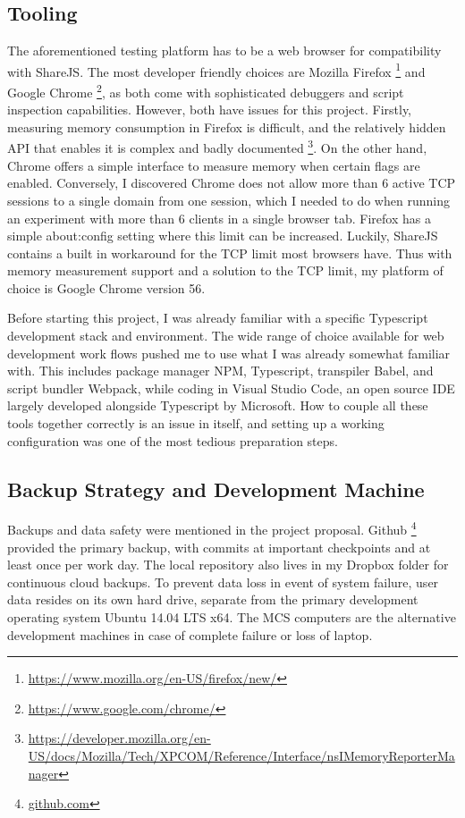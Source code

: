 \documentclass[12pt,a4paper,twoside,openright]{report}
\begin{document}
	\subsection{Tooling}
	The aforementioned testing platform has to be a web browser for compatibility with ShareJS. The most developer friendly choices are Mozilla Firefox \footnote{\url{https://www.mozilla.org/en-US/firefox/new/}} and Google Chrome \footnote{\url{https://www.google.com/chrome/}}, as both come with sophisticated debuggers and script inspection capabilities. However, both have issues for this project. Firstly, measuring memory consumption in Firefox is difficult, and the relatively hidden API that enables it is complex and badly documented \footnote{\url{https://developer.mozilla.org/en-US/docs/Mozilla/Tech/XPCOM/Reference/Interface/nsIMemoryReporterManager}}. On the other hand, Chrome offers a simple interface to measure memory when certain flags are enabled. Conversely, I discovered Chrome does not allow more than 6 active TCP sessions to a single domain from one session, which I needed to do when running an experiment with more than 6 clients in a single browser tab. Firefox has a simple about:config setting where this limit can be increased. Luckily, ShareJS contains a built in workaround for the TCP limit most browsers have. Thus with memory measurement support and a solution to the TCP limit, my platform of choice is Google Chrome version 56.
	
	Before starting this project, I was already familiar with a specific Typescript development stack and environment. The wide range of choice available for web development work flows pushed me to use what I was already somewhat familiar with. This includes package manager NPM, Typescript, transpiler Babel, and script bundler Webpack, while coding in Visual Studio Code, an open source IDE largely developed alongside Typescript by Microsoft. How to couple all these tools together correctly is an issue in itself, and setting up a working configuration was one of the most tedious preparation steps.
	
	\subsection{Backup Strategy and Development Machine}
	Backups and data safety were mentioned in the project proposal. Github \footnote{\url{github.com}} provided the primary backup, with commits at important checkpoints and at least once per work day. The local repository also lives in my Dropbox folder for continuous cloud backups. To prevent data loss in event of system failure, user data resides on its own hard drive, separate from the primary development operating system Ubuntu 14.04 LTS x64. The MCS computers are the alternative development machines in case of complete failure or loss of laptop.
	
\end{document}
